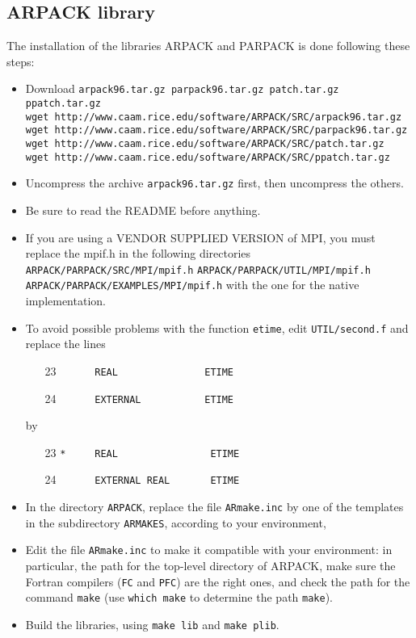 \documentclass{book}
\begin{document}
\subsection{ARPACK library}
The installation of the libraries ARPACK and PARPACK is done following these steps:
\begin{itemize}
\item Download \verb?arpack96.tar.gz parpack96.tar.gz patch.tar.gz ppatch.tar.gz?\\
\verb?wget http://www.caam.rice.edu/software/ARPACK/SRC/arpack96.tar.gz?\\
\verb?wget http://www.caam.rice.edu/software/ARPACK/SRC/parpack96.tar.gz?\\
\verb?wget http://www.caam.rice.edu/software/ARPACK/SRC/patch.tar.gz?\\
\verb?wget http://www.caam.rice.edu/software/ARPACK/SRC/ppatch.tar.gz?

\item Uncompress the archive \verb?arpack96.tar.gz? first, then
  uncompress the others.
\item Be sure to read the README before anything.
\item If you are using a VENDOR SUPPLIED VERSION of MPI, you must
  replace the mpif.h in the following directories
  \verb?ARPACK/PARPACK/SRC/MPI/mpif.h?
  \verb?ARPACK/PARPACK/UTIL/MPI/mpif.h?
  \verb?ARPACK/PARPACK/EXAMPLES/MPI/mpif.h? with the one for the native implementation.
\item To avoid possible problems with the function \verb?etime?, edit 
\verb?UTIL/second.f? and replace the lines
\begin{itemize} 
\item[23] \verb?      REAL               ETIME?
\item[24] \verb?      EXTERNAL           ETIME?
\end{itemize}
by
\begin{itemize} 
\item[23] \verb?*     REAL                ETIME?
\item[24] \verb?      EXTERNAL REAL       ETIME?
\end{itemize}
\item In the directory \verb?ARPACK?, replace the file \verb?ARmake.inc?
 by one of the templates in the subdirectory \verb?ARMAKES?, according to your environment,
\item Edit the file \verb?ARmake.inc? to make it compatible with your
  environment: in particular, the path for the top-level directory of
  ARPACK, make sure the Fortran compilers (\verb?FC? and \verb?PFC?)
  are the right ones, and check the path for the command \verb?make?
  (use \verb?which make? to determine the path \verb?make?).
\item Build the libraries, using \verb?make lib? and \verb?make plib?.
\end{itemize}
\end{document}
